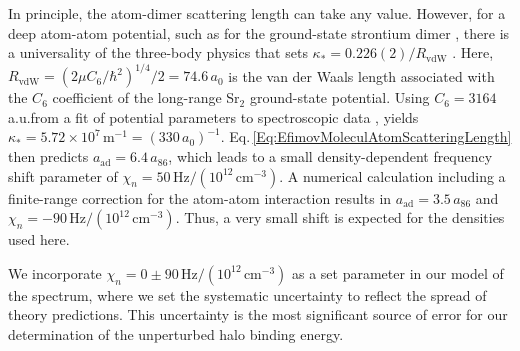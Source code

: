 In principle, the atom-dimer scattering length can take any value.
However, for a deep atom-atom potential, such as for the ground-state strontium dimer \cite{Stein2010}, there is a universality of the three-body physics that sets $\kappa_*=0.226(2)/R_{\mathrm{vdW}}$ \cite{wie12}.
Here, $R_{\mathrm{vdW}}=\left({2\mu C_6}/{\hbar^2}\right)^{1/4}/2=74.6$\,$a_0$ is the van der Waals length associated with the $C_6$ coefficient of the long-range Sr$_2$ ground-state potential.
Using $C_6=3164$a.u.\;from a fit of potential parameters to spectroscopic data \cite{Stein2010}, yields $\kappa_*=5.72\times 10^7$\,m$^{-1}=(330\,a_0)^{-1}$.
Eq.\,\ref{Eq:EfimovMoleculAtomScatteringLength} then predicts $a_{\text{ad}}=6.4\, a_{86}$, which leads to a small density-dependent frequency shift parameter of $\chi_n=50\,\mathrm{Hz}/(10^{12}\,\mathrm{cm}^{-3})$.
A numerical calculation including a finite-range correction for the atom-atom interaction \cite{mwc17} results in $a_{\text{ad}}=3.5\, a_{86}$ and $\chi_n=-90\,\mathrm{Hz}/(10^{12}\,\mathrm{cm}^{-3})$.
Thus, a very small shift is expected for the densities used here.

We incorporate $\chi_n=0\pm 90 \,\mathrm{Hz}/(10^{12}\,\mathrm{cm}^{-3})$ as a set parameter in our model of the spectrum, where we set the systematic uncertainty to reflect the spread of theory predictions.
This uncertainty is the most significant source of error for our determination of the unperturbed halo binding energy.

